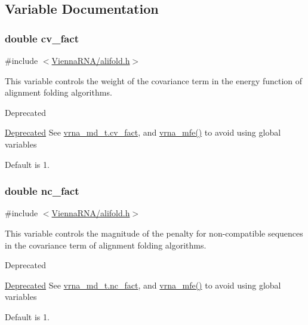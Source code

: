 \subsection{Variable Documentation}
\subsubsection[{\texorpdfstring{cv\+\_\+fact}{cv_fact}}]{\setlength{\rightskip}{0pt plus 5cm}double cv\+\_\+fact}\hypertarget{group__consensus__fold_gaf3cbac6ff5d706d6e414677841ddf94c}{}\label{group__consensus__fold_gaf3cbac6ff5d706d6e414677841ddf94c}


{\ttfamily \#include $<$\hyperlink{alifold_8h}{Vienna\+R\+N\+A/alifold.\+h}$>$}



This variable controls the weight of the covariance term in the energy function of alignment folding algorithms. 

\begin{DoxyRefDesc}{Deprecated}
\item[\hyperlink{deprecated__deprecated000016}{Deprecated}]See \hyperlink{group__model__details_a62ebefb9d0643e5c4c8a2ec84a105ce6}{vrna\+\_\+md\+\_\+t.\+cv\+\_\+fact}, and \hyperlink{group__mfe__fold_gabd3b147371ccf25c577f88bbbaf159fd}{vrna\+\_\+mfe()} to avoid using global variables\end{DoxyRefDesc}


Default is 1. 
\subsubsection[{\texorpdfstring{nc\+\_\+fact}{nc_fact}}]{\setlength{\rightskip}{0pt plus 5cm}double nc\+\_\+fact}\hypertarget{group__consensus__fold_ga502948a122a2af5b914355b1f3ea2f61}{}\label{group__consensus__fold_ga502948a122a2af5b914355b1f3ea2f61}


{\ttfamily \#include $<$\hyperlink{alifold_8h}{Vienna\+R\+N\+A/alifold.\+h}$>$}



This variable controls the magnitude of the penalty for non-\/compatible sequences in the covariance term of alignment folding algorithms. 

\begin{DoxyRefDesc}{Deprecated}
\item[\hyperlink{deprecated__deprecated000017}{Deprecated}]See \hyperlink{group__model__details_abcf568e6124bfcb2f847ff4eb0dfded6}{vrna\+\_\+md\+\_\+t.\+nc\+\_\+fact}, and \hyperlink{group__mfe__fold_gabd3b147371ccf25c577f88bbbaf159fd}{vrna\+\_\+mfe()} to avoid using global variables\end{DoxyRefDesc}


Default is 1. 